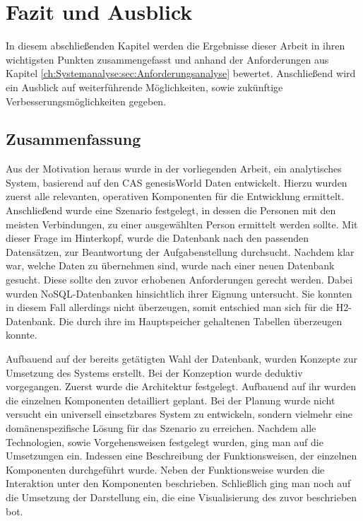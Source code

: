 
\chapter{Fazit und Ausblick}
\label{ch:Ergebnis}

In diesem abschließenden Kapitel werden die Ergebnisse dieser Arbeit in ihren wichtigsten Punkten zusammengefasst und anhand der Anforderungen aus Kapitel \ref{ch:Systemanalyse:sec:Anforderungsanalyse} bewertet. Anschließend wird ein Ausblick auf weiterführende Möglichkeiten, sowie zukünftige Verbesserungsmöglichkeiten gegeben. 

\section{Zusammenfassung}
\label{ch:Ergebnis:sec:zusammenfassung}

Aus der Motivation heraus wurde in der vorliegenden Arbeit, ein analytisches System, basierend auf den CAS genesisWorld Daten entwickelt. Hierzu wurden zuerst alle relevanten, operativen Komponenten für die Entwicklung ermittelt. Anschließend wurde eine Szenario festgelegt, in dessen die Personen mit den meisten Verbindungen, zu einer ausgewählten Person ermittelt werden sollte. Mit dieser Frage im Hinterkopf, wurde die Datenbank nach den passenden Datensätzen, zur Beantwortung der Aufgabenstellung durchsucht. Nachdem klar war, welche Daten zu übernehmen sind, wurde nach einer neuen Datenbank gesucht. Diese sollte den zuvor erhobenen Anforderungen gerecht werden. Dabei wurden NoSQL-Datenbanken hinsichtlich ihrer Eignung untersucht. Sie konnten in diesem Fall allerdings nicht überzeugen, somit entschied man sich für die H2-Datenbank. Die durch ihre im Hauptspeicher gehaltenen Tabellen überzeugen konnte.   

Aufbauend auf der bereits getätigten Wahl der Datenbank, wurden Konzepte zur Umsetzung des Systems  erstellt. Bei der Konzeption wurde deduktiv vorgegangen. Zuerst wurde die Architektur festgelegt. Aufbauend auf ihr wurden die einzelnen Komponenten detailliert geplant. Bei der Planung wurde nicht versucht ein universell einsetzbares System zu entwickeln, sondern vielmehr eine domänenspezifische Lösung für das Szenario zu erreichen. Nachdem alle Technologien, sowie Vorgehensweisen festgelegt wurden, ging man auf die Umsetzungen ein. Indessen eine Beschreibung der Funktionsweisen, der einzelnen Komponenten durchgeführt wurde. Neben der Funktionsweise wurden die Interaktion unter den Komponenten beschrieben. Schließlich ging man noch auf die Umsetzung der Darstellung ein, die eine Visualisierung des zuvor beschrieben bot. 
 
